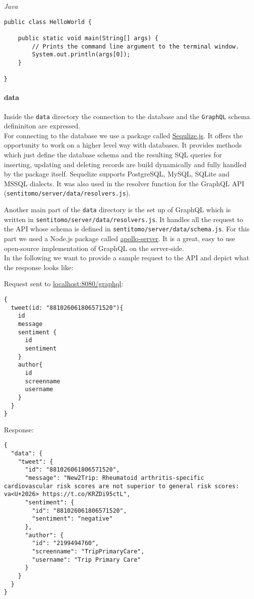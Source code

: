 \documentclass[]{article}
\let\oldparagraph\paragraph
\renewcommand{\paragraph}[1]{\oldparagraph{#1}\mbox{}}
\begin{document}
\emph{Java}

\begin{verbatim}
public class HelloWorld {

    public static void main(String[] args) {
        // Prints the command line argument to the terminal window.
        System.out.println(args[0]);
    }

}
\end{verbatim}

\paragraph{data}\label{data}

Inside the \texttt{data} directory the connection to the database and
the \texttt{GraphQL} schema defininiton are expressed.\\
For connecting to the database we use a package called
\href{http://docs.sequelizejs.com/}{Sequlize.js}. It offers the
opportunity to work on a higher level way with databases. It provides
methods which just define the database schema and the resulting SQL
queries for inserting, updating and deleting records are build
dynamically and fully handled by the package itself. Sequelize supports
PostgreSQL, MySQL, SQLite and MSSQL dialects. It was also used in the
resolver function for the GraphQL API
(\texttt{sentitomo/server/data/resolvers.js}).

Another main part of the \texttt{data} directory is the set up of
GraphQL which is written in \texttt{sentitomo/server/data/resolvers.js}.
It handles all the request to the API whose schema is defined in
\texttt{sentitomo/server/data/schema.js}. For this part we used a
Node.js package called
\href{https://github.com/apollographql/apollo-server}{apollo-server}. It
is a great, easy to use open-source implementation of GraphQL on the
server-side.\\
In the following we want to provide a sample request to the API and
depict what the response looks like:

Request sent to \href{}{localhost:8080/graphql}:

\begin{verbatim}
{
  tweet(id: "881026061806571520"){
    id
    message
    sentiment {
      id
      sentiment
    }
    author{
      id
      screenname
      username
    }
  }
}
\end{verbatim}

Response:

\begin{verbatim}
{
  "data": {
    "tweet": {
      "id": "881026061806571520",
      "message": "New2Trip: Rheumatoid arthritis-specific cardiovascular risk scores are not superior to general risk scores: va<U+2026> https://t.co/KRZDi95ctL",
      "sentiment": {
        "id": "881026061806571520",
        "sentiment": "negative"
      },
      "author": {
        "id": "2199494760",
        "screenname": "TripPrimaryCare",
        "username": "Trip Primary Care"
      }
    }
  }
}
\end{verbatim}
\end{document}
